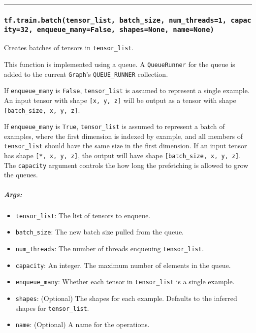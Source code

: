 \begin{center}\rule{0.5\linewidth}{\linethickness}\end{center}

\subsubsection{\texorpdfstring{\texttt{tf.train.batch(tensor\_list,\ batch\_size,\ num\_threads=1,\ capacity=32,\ enqueue\_many=False,\ shapes=None,\ name=None)}
}{tf.train.batch(tensor\_list, batch\_size, num\_threads=1, capacity=32, enqueue\_many=False, shapes=None, name=None) }}\label{tf.train.batchtensorux5flist-batchux5fsize-numux5fthreads1-capacity32-enqueueux5fmanyfalse-shapesnone-namenone}

Creates batches of tensors in \texttt{tensor\_list}.

This function is implemented using a queue. A \texttt{QueueRunner} for
the queue is added to the current \texttt{Graph}'s
\texttt{QUEUE\_RUNNER} collection.

If \texttt{enqueue\_many} is \texttt{False}, \texttt{tensor\_list} is
assumed to represent a single example. An input tensor with shape
\texttt{{[}x,\ y,\ z{]}} will be output as a tensor with shape
\texttt{{[}batch\_size,\ x,\ y,\ z{]}}.

If \texttt{enqueue\_many} is \texttt{True}, \texttt{tensor\_list} is
assumed to represent a batch of examples, where the first dimension is
indexed by example, and all members of \texttt{tensor\_list} should have
the same size in the first dimension. If an input tensor has shape
\texttt{{[}*,\ x,\ y,\ z{]}}, the output will have shape
\texttt{{[}batch\_size,\ x,\ y,\ z{]}}. The \texttt{capacity} argument
controls the how long the prefetching is allowed to grow the queues.

\subparagraph{Args: }\label{args-63}

\begin{itemize}
\tightlist
\item
  \texttt{tensor\_list}: The list of tensors to enqueue.
\item
  \texttt{batch\_size}: The new batch size pulled from the queue.
\item
  \texttt{num\_threads}: The number of threads enqueuing
  \texttt{tensor\_list}.
\item
  \texttt{capacity}: An integer. The maximum number of elements in the
  queue.
\item
  \texttt{enqueue\_many}: Whether each tensor in \texttt{tensor\_list}
  is a single example.
\item
  \texttt{shapes}: (Optional) The shapes for each example. Defaults to
  the inferred shapes for \texttt{tensor\_list}.
\item
  \texttt{name}: (Optional) A name for the operations.
\end{itemize}

